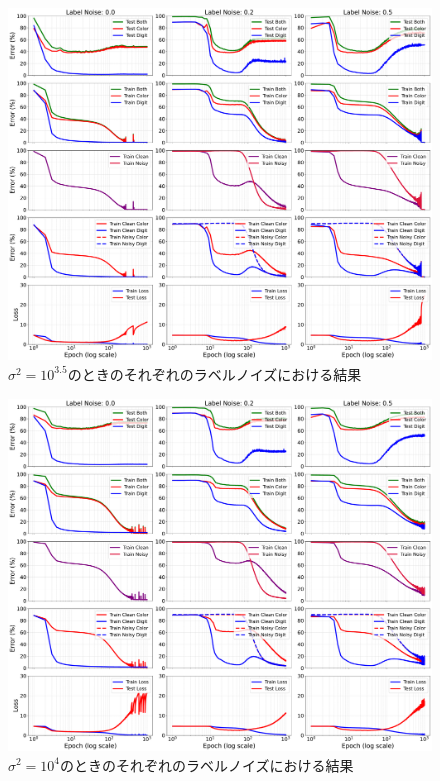 \begin{figure}[H]
    \centering
    \includegraphics[width=\linewidth]{fig/erroe_metrics_by_variances/error_metrics_by_label_noise_variance_3612.pdf}
    \caption{$\sigma^2 = 10^{3.5}$のときのそれぞれのラベルノイズにおける結果}
    \label{fig:errors_by_label_noise_variance_3612}
\end{figure}

\begin{figure}[H]
    \centering
    \includegraphics[width=\linewidth]{fig/erroe_metrics_by_variances/error_metrics_by_label_noise_variance_10000.pdf}
    \caption{$\sigma^2 = 10^4$のときのそれぞれのラベルノイズにおける結果}
    \label{fig:errors_by_label_noise_variance_10000}
\end{figure}

